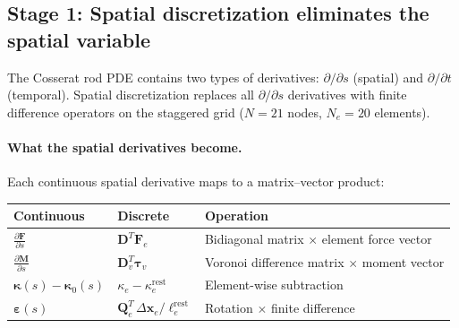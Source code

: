 \documentclass[11pt]{article}
\newcommand{\vect}[1]{\mathbf{#1}}
\newcommand{\mat}[1]{\mathbf{#1}}
\newcommand{\dds}[1]{\frac{\partial #1}{\partial s}}
\begin{document}
\begin{center}
\end{center}

\subsection{Stage 1: Spatial discretization eliminates the spatial variable}

The Cosserat rod PDE contains two types of derivatives: $\partial/\partial s$ (spatial) and $\partial/\partial t$ (temporal).
Spatial discretization replaces all $\partial/\partial s$ derivatives with finite difference operators on the staggered grid ($N = 21$ nodes, $N_e = 20$ elements).

\paragraph{What the spatial derivatives become.}
Each continuous spatial derivative maps to a matrix--vector product:

\begin{table}[H]
\centering
\renewcommand{\arraystretch}{1.3}
\begin{tabular}{@{}lll@{}}
\toprule
\textbf{Continuous} & \textbf{Discrete} & \textbf{Operation} \\
\midrule
$\displaystyle\dds{\vect{F}}$ &
  $\mat{D}^T \vect{F}_e$ &
  Bidiagonal matrix $\times$ element force vector \\[6pt]
$\displaystyle\dds{\vect{M}}$ &
  $\mat{D}_v^T \bm{\tau}_v$ &
  Voronoi difference matrix $\times$ moment vector \\[6pt]
$\bm{\kappa}(s) - \bm{\kappa}_0(s)$ &
  $\kappa_e - \kappa_e^{\text{rest}}$ &
  Element-wise subtraction \\[4pt]
$\bm{\varepsilon}(s)$ &
  $\mat{Q}_e^T\,\Delta\vect{x}_e / \ell_e^{\text{rest}}$ &
  Rotation $\times$ finite difference \\
\bottomrule
\end{tabular}
\end{table}
\end{document}

